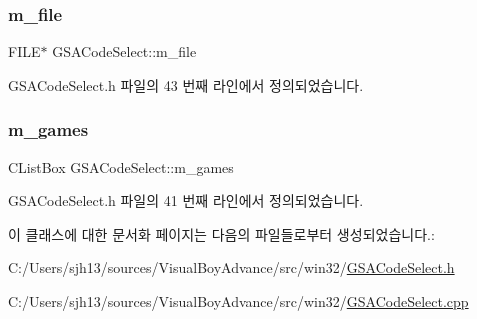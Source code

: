\subsubsection{\texorpdfstring{m\+\_\+file}{m\_file}}
{\footnotesize\ttfamily F\+I\+LE$\ast$ G\+S\+A\+Code\+Select\+::m\+\_\+file}



G\+S\+A\+Code\+Select.\+h 파일의 43 번째 라인에서 정의되었습니다.

\mbox{\label{class_g_s_a_code_select_a732e7dca958e45d23a1d00234c23c838}} 
\subsubsection{\texorpdfstring{m\+\_\+games}{m\_games}}
{\footnotesize\ttfamily C\+List\+Box G\+S\+A\+Code\+Select\+::m\+\_\+games}



G\+S\+A\+Code\+Select.\+h 파일의 41 번째 라인에서 정의되었습니다.



이 클래스에 대한 문서화 페이지는 다음의 파일들로부터 생성되었습니다.\+:\begin{DoxyCompactItemize}
\item 
C\+:/\+Users/sjh13/sources/\+Visual\+Boy\+Advance/src/win32/\mbox{\hyperlink{_g_s_a_code_select_8h}{G\+S\+A\+Code\+Select.\+h}}\item 
C\+:/\+Users/sjh13/sources/\+Visual\+Boy\+Advance/src/win32/\mbox{\hyperlink{_g_s_a_code_select_8cpp}{G\+S\+A\+Code\+Select.\+cpp}}\end{DoxyCompactItemize}
